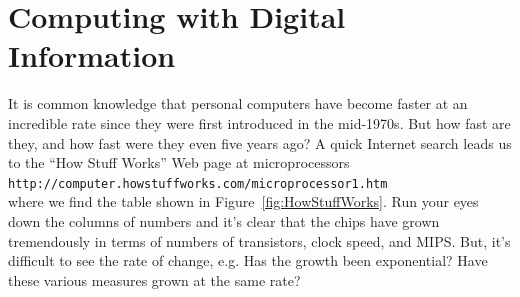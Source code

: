 \chapter{Computing with Digital Information}
It is common knowledge that personal computers have become faster at
an incredible rate since they were first introduced in the mid-1970s.
But how fast are they, and how fast were they even five years ago?  A
quick Internet search leads us to the ``How Stuff Works'' Web page at
microprocessors\\
{\footnotesize{\texttt{http://computer.howstuffworks.com/microprocessor1.htm}}}\\
where we find the table shown in Figure~\ref{fig:HowStuffWorks}.  Run
your eyes down the columns of numbers and it's clear that the chips
have grown tremendously in terms of numbers of transistors, clock
speed, and MIPS.  But, it's difficult to see the rate of change,
e.g. Has the growth been exponential? Have these various measures
grown at the same rate?


